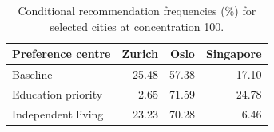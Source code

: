 \begin{table}[!ht]\centering
\caption{Conditional recommendation frequencies (\%) for selected cities at concentration 100.}
\begin{tabular}{lrrr}\toprule
Preference centre & Zurich & Oslo & Singapore\\\midrule
Baseline & 25.48 & 57.38 & 17.10 \\
Education priority & 2.65 & 71.59 & 24.78 \\
Independent living & 23.23 & 70.28 & 6.46 \\
\bottomrule\end{tabular}\end{table}
